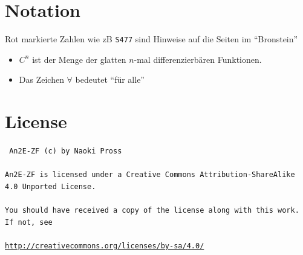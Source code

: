 \documentclass[margin=small, twocolumn]{hsrzf}
\numberwithin{equation}{subsection}
\newcommand{\brpage}[1]{\textcolor{red!70!black}{\small\texttt{S#1}}}
\begin{document}
\section*{Notation}
Rot markierte Zahlen wie zB \brpage{477} sind Hinweise auf die Seiten im ``Bronstein'' \cite{bronstein}

\begin{itemize}
    \item \(C^n\) ist der Menge der glatten \(n\)-mal differenzierb\"aren Funktionen.
    \item Das Zeichen \(\forall\) bedeutet ``f\"ur alle''
\end{itemize}

\section*{License}
{ \tt
An2E-ZF (c) by Naoki Pross
\\\\
An2E-ZF is licensed under a Creative Commons Attribution-ShareAlike 4.0 Unported License.
\\\\
You should have received a copy of the license along with this work. If not, see 
\\\\
{\small\url{http://creativecommons.org/licenses/by-sa/4.0/}}
}


\onecolumn
\end{document}
